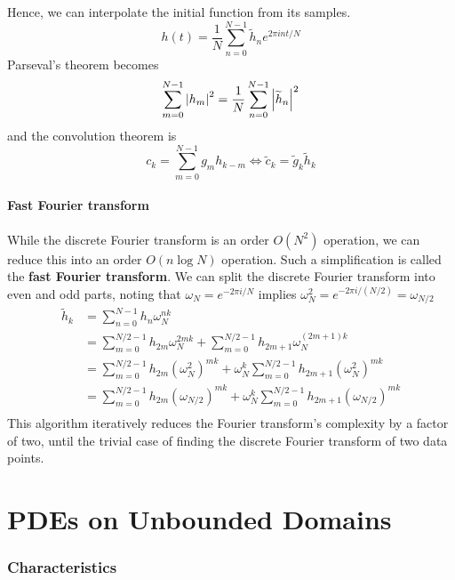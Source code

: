 \documentclass[a4paper]{article}
\begin{document}
Hence, we can interpolate the initial function from its samples.
\[
	h(t) = \frac{1}{N} \sum_{n=0}^{N-1} \widetilde h_n e^{2\pi i n t / N}
\]
Parseval's theorem becomes
\[
	\sum_{m=0}^{N-1} \abs{h_m}^2 = \frac{1}{N} \sum_{n=0}^{N-1} \abs{\widetilde h_n}^2
\]
and the convolution theorem is
\[
	c_k = \sum_{m=0}^{N-1} g_m h_{k-m} \iff \widetilde c_k = \widetilde g_k \widetilde h_k
\]

\subsection{Fast Fourier transform}
While the discrete Fourier transform is an order \( O(N^2) \) operation, we can reduce this into an order \( O(n \log N) \) operation.
Such a simplification is called the \textbf{fast Fourier transform}.
We can split the discrete Fourier transform into even and odd parts, noting that \( \omega_N = e^{-2\pi i / N} \) implies \( \omega_N^2 = e^{-2 \pi i / (N/2)} = \omega_{N/2} \)
\begin{align*}
	\widetilde h_k & = \sum_{n=0}^{N-1} h_n \omega_N^{nk}                                                                           \\
	               & = \sum_{m=0}^{N/2-1} h_{2m} \omega_N^{2mk} + \sum_{m=0}^{N/2-1} h_{2m + 1} \omega_N^{(2m+1)k}                  \\
	               & = \sum_{m=0}^{N/2-1} h_{2m} (\omega_N^2)^{mk} + \omega_N^k \sum_{m=0}^{N/2-1} h_{2m + 1} (\omega_N^2)^{mk}     \\
	               & = \sum_{m=0}^{N/2-1} h_{2m} (\omega_{N/2})^{mk} + \omega_N^k \sum_{m=0}^{N/2-1} h_{2m + 1} (\omega_{N/2})^{mk} \\
\end{align*}
This algorithm iteratively reduces the Fourier transform's complexity by a factor of two, until the trivial case of finding the discrete Fourier transform of two data points.

\clearpage 
\part{PDEs on Unbounded Domains}

\section{Characteristics}
\end{document}
